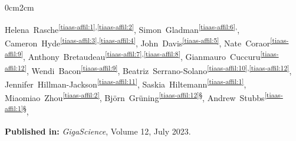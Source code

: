 \setcounter{NAT@ctr}{-1}
\cleartorightpage
\chapter*{}\label{chapter:tiaas}


\begin{changemargin}{0cm}{2cm}
\end{changemargin}

Helena~Rasche\textsuperscript{\ref{tiaas-affil:1},\ref{tiaas-affil:2}},
Simon~Gladman\textsuperscript{\ref{tiaas-affil:6},\dag},
Cameron~Hyde\textsuperscript{\ref{tiaas-affil:3},\ref{tiaas-affil:4}},
John~Davis\textsuperscript{\ref{tiaas-affil:5}},
Nate~Coraor\textsuperscript{\ref{tiaas-affil:9}},
Anthony~Bretaudeau\textsuperscript{\ref{tiaas-affil:7},\ref{tiaas-affil:8}},
Gianmauro~Cuccuru\textsuperscript{\ref{tiaas-affil:12}},
Wendi~Bacon\textsuperscript{\ref{tiaas-affil:9}},
Beatriz~Serrano-Solano\textsuperscript{\ref{tiaas-affil:10},\ref{tiaas-affil:12}},
Jennifer~Hillman-Jackson\textsuperscript{\ref{tiaas-affil:11}},
Saskia~Hiltemann\textsuperscript{\ref{tiaas-affil:1}},
Miaomiao~Zhou\textsuperscript{\ref{tiaas-affil:2}},
Bj\"orn~Gr\"uning\textsuperscript{\ref{tiaas-affil:12}§},
Andrew~Stubbs\textsuperscript{\ref{tiaas-affil:1}§},


\textbf{Published in:} \emph{GigaScience}, Volume 12, July 2023.\\

\small

